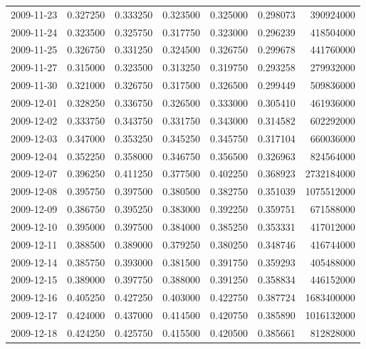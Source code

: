 \begin{tabular}{lrrrrrr}
2009-11-23 &    0.327250 &    0.333250 &    0.323500 &    0.325000 &    0.298073 &   390924000 \\
2009-11-24 &    0.323500 &    0.325750 &    0.317750 &    0.323000 &    0.296239 &   418504000 \\
2009-11-25 &    0.326750 &    0.331250 &    0.324500 &    0.326750 &    0.299678 &   441760000 \\
2009-11-27 &    0.315000 &    0.323500 &    0.313250 &    0.319750 &    0.293258 &   279932000 \\
2009-11-30 &    0.321000 &    0.326750 &    0.317500 &    0.326500 &    0.299449 &   509836000 \\
2009-12-01 &    0.328250 &    0.336750 &    0.326500 &    0.333000 &    0.305410 &   461936000 \\
2009-12-02 &    0.333750 &    0.343750 &    0.331750 &    0.343000 &    0.314582 &   602292000 \\
2009-12-03 &    0.347000 &    0.353250 &    0.345250 &    0.345750 &    0.317104 &   660036000 \\
2009-12-04 &    0.352250 &    0.358000 &    0.346750 &    0.356500 &    0.326963 &   824564000 \\
2009-12-07 &    0.396250 &    0.411250 &    0.377500 &    0.402250 &    0.368923 &  2732184000 \\
2009-12-08 &    0.395750 &    0.397500 &    0.380500 &    0.382750 &    0.351039 &  1075512000 \\
2009-12-09 &    0.386750 &    0.395250 &    0.383000 &    0.392250 &    0.359751 &   671588000 \\
2009-12-10 &    0.395000 &    0.397500 &    0.384000 &    0.385250 &    0.353331 &   417012000 \\
2009-12-11 &    0.388500 &    0.389000 &    0.379250 &    0.380250 &    0.348746 &   416744000 \\
2009-12-14 &    0.385750 &    0.393000 &    0.381500 &    0.391750 &    0.359293 &   405488000 \\
2009-12-15 &    0.389000 &    0.397750 &    0.388000 &    0.391250 &    0.358834 &   446152000 \\
2009-12-16 &    0.405250 &    0.427250 &    0.403000 &    0.422750 &    0.387724 &  1683400000 \\
2009-12-17 &    0.424000 &    0.437000 &    0.414500 &    0.420750 &    0.385890 &  1016132000 \\
2009-12-18 &    0.424250 &    0.425750 &    0.415500 &    0.420500 &    0.385661 &   812828000 \\

\end{tabular}
